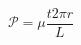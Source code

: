 \begin{equation}
    \mathcal{P} = \mu \frac{ t 2 \pi r}{L}
    \label{eq:permeance}
\end{equation}
